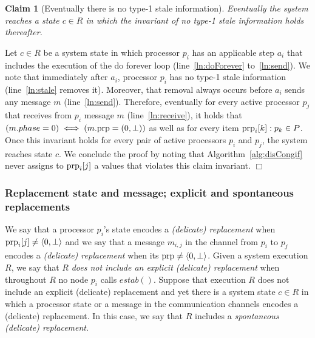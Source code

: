 \documentclass[11pt]{article}
\newcommand{\configEstab}{estab}
\newcommand{\notif}{prp}
\newtheorem{claim}[theorem]{Claim}
\newenvironment{proof}{\noindent{\bf Proof.}}{\hfill$\Box$}
\begin{document}
\begin{claim}[Eventually there is no type-1 stale information]
\label{thm:noStale}
Eventually the system reaches a state $c \in R$ in which the invariant of no type-1 stale information holds thereafter.
\end{claim}
\begin{proof}
Let $c \in R$ be a system state in which processor $p_i$ has an applicable step $a_i$ that includes the execution of the do forever loop (line~\ref{ln:doForever} to~\ref{ln:send}).
We note that immediately after $a_i$, processor $p_i$ has no type-1 stale information (line~\ref{ln:stale} removes it). Moreover, that removal always occurs before $a_i$ sends any message $m$ (line~\ref{ln:send}). Therefore, eventually for every active processor $p_j$ that receives from $p_i$ message $m$ (line~\ref{ln:receive}), it holds that $(m.phase = 0) \iff (m.\textnormal{\notif} = (0, \bot))$ as well as for every item $\textnormal{\notif}_i[k]: p_k \in P$. Once this invariant holds for every pair of active processors $p_i$ and $p_j$, the system reaches state $c$. We conclude the proof by noting that Algorithm~\ref{alg:disCongif} never assigns to $\textnormal{\notif}_i[j]$ a values that violates this claim invariant.    
\end{proof}



\subsubsection*{Replacement state and message; explicit and spontaneous replacements}
We say that a processor $p_i$'s state encodes a \emph{(delicate) replacement} when $\textnormal{\notif}_i[j] \neq \langle 0, \bot \rangle$ and we say that a message $m_{i,j}$ in the channel from $p_i$ to $p_j$ encodes a \emph{(delicate) replacement} when its $\textnormal{\notif} \neq\langle 0, \bot  \rangle$. 
Given a system execution $R$, we say that $R$ \emph{does not include an explicit (delicate) replacement} when throughout $R$ no node $p_i$ calls $\configEstab()$. Suppose that execution $R$ does not include an explicit (delicate) replacement and yet there is a system state $c \in R$ in which a processor state or a message in the communication channels encodes a (delicate) replacement. In this case, we say that $R$ includes a \emph{spontaneous (delicate) replacement}.
\end{document}
